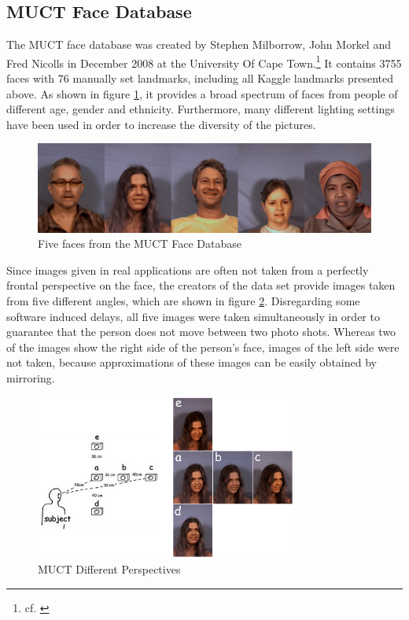 \documentclass[11pt, a4paper]{article}
\begin{document}
\subsection{MUCT Face Database}

The \acf{MUCT} face database was created by Stephen Milborrow, John Morkel and Fred Nicolls in December 2008 at the University Of Cape Town.\footnote{cf. \cite{muct}} It contains 3755 faces with 76 manually set landmarks, including all Kaggle landmarks presented above. As shown in figure \ref{fig:muctfaces}, it provides a broad spectrum of faces from people of different age, gender and ethnicity. Furthermore, many different lighting settings have been used in order to increase the diversity of the pictures.

\begin{figure}[htbp]
	\centering
	\includegraphics[width=\textwidth]{muct_faces.png}
	\caption{Five faces from the MUCT Face Database}
	\label{fig:muctfaces}
\end{figure}

Since images given in real applications are often not taken from a perfectly frontal perspective on the face, the creators of the data set provide images taken from five different angles, which are shown in figure \ref{fig:muctangles}. Disregarding some software induced delays, all five images were taken simultaneously in order to guarantee that the person does not move between two photo shots. Whereas two of the images show the right side of the person's face, images of the left side were not taken, because approximations of these images can be easily obtained by mirroring.

\begin{figure}[htbp]
	\centering
	\includegraphics[width=0.77\textwidth]{muct_perspectives.png}
	\caption[MUCT Different Perspectives]{MUCT Different Perspectives\footnotemark}
	\label{fig:muctangles}
\end{figure}
\end{document}
